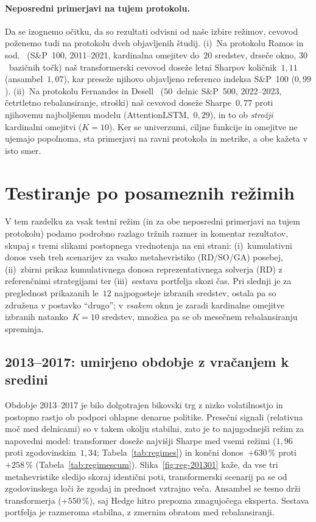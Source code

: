 \paragraph{Neposredni primerjavi na tujem protokolu.}\label{sec:headtohead}
Da se izognemo očitku, da so rezultati odvisni od naše izbire režimov, cevovod poženemo tudi na protokolu dveh objavljenih študij. (i)~Na protokolu Ramos in sod.~\cite{ramos2023} (S\&P~100, 2011--2021, kardinalna omejitev do~$20$ sredstev, drseče okno, $30$~bazičnih točk) naš transformerski cevovod doseže letni Sharpov količnik~$1{,}11$ (ansambel~$1{,}07$), kar preseže njihovo objavljeno referenco indeksa S\&P~100 ($0{,}99$). (ii)~Na protokolu Fernandes in Desell~\cite{fernandes2026} ($50$~delnic S\&P~500, 2022--2023, četrtletno rebalansiranje, stroški) naš cevovod doseže Sharpe~$0{,}77$ proti njihovemu najboljšemu modelu (AttentionLSTM,~$0{,}29$), in to ob \emph{strožji} kardinalni omejitvi ($K{=}10$). Ker se univerzumi, ciljne funkcije in omejitve ne ujemajo popolnoma, sta primerjavi na ravni protokola in metrike, a obe kažeta v isto smer.

\section{Testiranje po posameznih režimih}
\label{sec:perregime}

V tem razdelku za vsak testni režim (in za obe neposredni primerjavi na tujem protokolu) podamo podrobno razlago tržnih razmer in komentar rezultatov, skupaj s tremi slikami postopnega vrednotenja na eni strani: (i)~kumulativni donos vseh treh scenarijev za vsako metahevristiko (RD/SO/GA) posebej, (ii)~zbirni prikaz kumulativnega donosa reprezentativnega solverja (RD) z referenčnimi strategijami ter (iii)~sestava portfelja skozi čas. Pri slednji je za preglednost prikazanih le~$12$ najpogosteje izbranih sredstev, ostala pa so združena v postavko ``drugo''; v \emph{vsakem} oknu je zaradi kardinalne omejitve izbranih natanko~$K=10$ sredstev, množica pa se ob mesečnem rebalansiranju spreminja.

\subsection{2013--2017: umirjeno obdobje z vračanjem k sredini}
\label{sec:reg-201301}

Obdobje 2013--2017 je bilo dolgotrajen bikovski trg z nizko volatilnostjo in postopno rastjo ob podpori ohlapne denarne politike. Presečni signali (relativna moč med delnicami) so v takem okolju stabilni, zato je to najugodnejši režim za napovedni model: transformer doseže najvišji Sharpe med vsemi režimi ($1{,}96$ proti zgodovinskim~$1{,}34$; Tabela~\ref{tab:regimes}) in končni donos~$+630\,\%$ proti~$+258\,\%$ (Tabela~\ref{tab:regimescum}). Slika~\ref{fig:reg-201301} kaže, da vse tri metahevristike sledijo skoraj identični poti, transformerski scenarij pa se od zgodovinskega loči že zgodaj in prednost vztrajno veča. Ansambel se tesno drži transformerja ($+550\,\%$), saj Hedge hitro prepozna zmagujočega eksperta. Sestava portfelja je razmeroma stabilna, z zmernim obratom med rebalansiranji.

